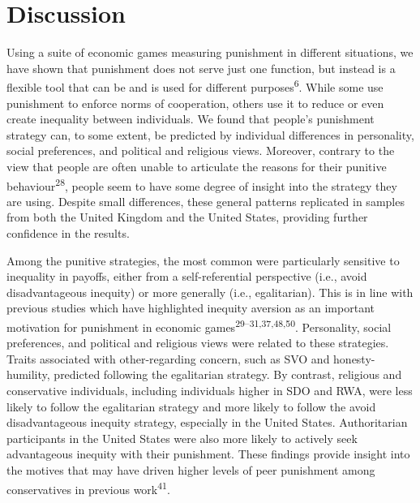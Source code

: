 \documentclass[
  english,
  man, donotrepeattitle,floatsintext]{apa6}
\begin{document}
\hypertarget{discussion}{%
\section{Discussion}\label{discussion}}

Using a suite of economic games measuring punishment in different situations,
we have shown that punishment does not serve just one function, but instead is
a flexible tool that can be and is used for different purposes\textsuperscript{6}.
While some use punishment to enforce norms of cooperation, others use it to
reduce or even create inequality between individuals. We found that people's
punishment strategy can, to some extent, be predicted by individual differences
in personality, social preferences, and political and religious views. Moreover,
contrary to the view that people are often unable to articulate the reasons for
their punitive behaviour\textsuperscript{28}, people seem to have some degree of
insight into the strategy they are using. Despite small differences, these
general patterns replicated in samples from both the United Kingdom and the
United States, providing further confidence in the results.

Among the punitive strategies, the most common were particularly sensitive to
inequality in payoffs, either from a self-referential perspective (i.e., avoid
disadvantageous inequity) or more generally (i.e., egalitarian). This is in
line with previous studies which have highlighted inequity aversion as an
important motivation for punishment in economic games\textsuperscript{29--31,37,48,50}.
Personality, social preferences, and political and religious views were related
to these strategies. Traits associated with other-regarding concern, such as SVO
and honesty-humility, predicted following the egalitarian strategy. By contrast,
religious and conservative individuals, including individuals higher in SDO and
RWA, were less likely to follow the egalitarian strategy and more likely to
follow the avoid disadvantageous inequity strategy, especially in the United
States. Authoritarian participants in the United States were also more likely to
actively seek advantageous inequity with their punishment. These findings
provide insight into the motives that may have driven higher levels of peer
punishment among conservatives in previous work\textsuperscript{41}.
\end{document}
